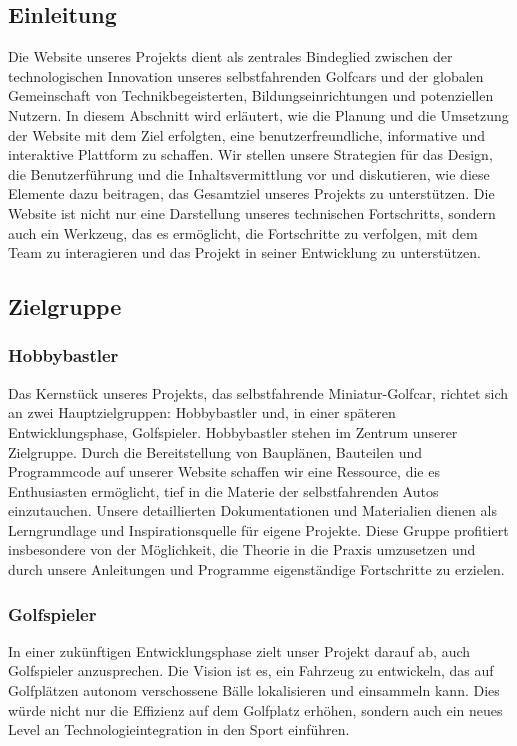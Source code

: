 \subsection{Einleitung}
Die Website unseres Projekts dient als zentrales Bindeglied zwischen der technologischen Innovation unseres selbstfahrenden Golfcars und der globalen Gemeinschaft von Technikbegeisterten, Bildungseinrichtungen und potenziellen Nutzern. In diesem Abschnitt wird erläutert, wie die Planung und die Umsetzung der Website mit dem Ziel erfolgten, eine benutzerfreundliche, informative und interaktive Plattform zu schaffen. Wir stellen unsere Strategien für das Design, die Benutzerführung und die Inhaltsvermittlung vor und diskutieren, wie diese Elemente dazu beitragen, das Gesamtziel unseres Projekts zu unterstützen. Die Website ist nicht nur eine Darstellung unseres technischen Fortschritts, sondern auch ein Werkzeug, das es ermöglicht, die Fortschritte zu verfolgen, mit dem Team zu interagieren und das Projekt in seiner Entwicklung zu unterstützen.

\subsection{Zielgruppe}
\subsubsection{Hobbybastler}
Das Kernstück unseres Projekts, das selbstfahrende Miniatur-Golfcar, richtet sich an zwei Hauptzielgruppen: Hobbybastler und, in einer späteren Entwicklungsphase, Golfspieler. Hobbybastler stehen im Zentrum unserer Zielgruppe. Durch die Bereitstellung von Bauplänen, Bauteilen und Programmcode auf unserer Website schaffen wir eine Ressource, die es Enthusiasten ermöglicht, tief in die Materie der selbstfahrenden Autos einzutauchen. Unsere detaillierten Dokumentationen und Materialien dienen als Lerngrundlage und Inspirationsquelle für eigene Projekte. Diese Gruppe profitiert insbesondere von der Möglichkeit, die Theorie in die Praxis umzusetzen und durch unsere Anleitungen und Programme eigenständige Fortschritte zu erzielen.

\newpage

\subsubsection{Golfspieler}
In einer zukünftigen Entwicklungsphase zielt unser Projekt darauf ab, auch Golfspieler anzusprechen. Die Vision ist es, ein Fahrzeug zu entwickeln, das auf Golfplätzen autonom verschossene Bälle lokalisieren und einsammeln kann. Dies würde nicht nur die Effizienz auf dem Golfplatz erhöhen, sondern auch ein neues Level an Technologieintegration in den Sport einführen. 

